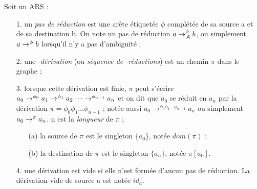 \begin{definition}[Dérivation]
  Soit un ARS \caA :
  \begin{itemize}

    \item[1.] un \emph{pas de réduction} est une arête étiquetée $\phi$ complétée de sa
      source a et de sa destination b. On note un pas de réduction
      $a \rightarrow^{\phi}_{\mathcal{A}}{} b$, ou simplement $a \rightarrow^{\phi_{}} b$ lorsqu'il n'y a pas
      d'ambiguïté ;

    \item[2.] une \emph{\caA-dérivation} (ou \emph{séquence de
      \caT-réductions}) est un chemin $\pi$ dans le graphe \caA ;

    \item[3.] lorsque cette dérivation est finie, $\pi$ peut s'écrire $a_0
      \rightarrow^{\phi_{0}} a_1 \rightarrow^{\phi_{1}} a_2 \cdots \rightarrow^{\phi_{n-1}} a_n$ et on dit
      que $a_0$ se réduit en $a_n$ par la dérivation $\pi =
      \phi_0\phi_1\ldots\phi_{n-1}$ ; notée aussi $a_0
      \rightarrow^{\phi_0\phi_1\ldots\phi_{n-1}} a_n$ ou simplement $a_0
      \rightarrow^{\pi} a_n$. n est la \emph{longueur} de $\pi$ ;
      \begin{itemize}
        \item[(a)] la source de $\pi$ est le singleton \{$a_0$\}, notée
          $dom(\pi)$ ;
        \item[(b)] la destination de $\pi$ est le singleton $\{a_n\}$, 
          notée $\pi[a_0]$.
      \end{itemize}
    \item[4.] une dérivation est vide si elle n'est formée d'aucun pas de
      réduction. La dérivation vide de source a est notée $id_a$.

  \end{itemize}
\end{definition}

